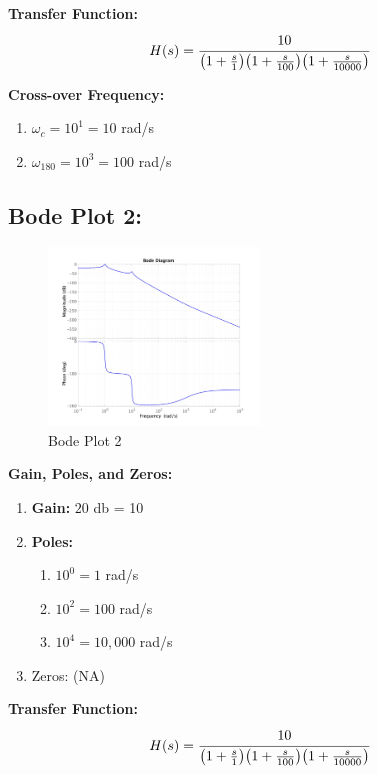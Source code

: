 \documentclass[letter]{article}
\numberwithin{equation}{section}
\begin{document}
\textbf{Transfer Function:}\[
	H(s) = \cfrac{10}{
		\qty(1 + \frac{s}{1}) \qty(1 + \frac{s}{100}) \qty(1 + \frac{s}{10000})
		}
\]

\textbf{Cross-over Frequency:}
\begin{enumerate}
	\item $\omega_c = 10^{1} = 10$ rad/s
	\item $\omega_{180} = 10^{3} = 100$ rad/s
\end{enumerate}



\newpage
\subsection{Bode Plot 2:}
\begin{figure}[h]
	\centering
	\includegraphics[width=0.5\textwidth]{figs/pblm3b.jpg}
	\caption{Bode Plot 2}
\end{figure}

\textbf{Gain, Poles, and Zeros:}
\begin{enumerate}
	\item \textbf{Gain:}  $20$ db = 10
	\item \textbf{Poles:}
	\begin{enumerate}
		\item $10^{0} = 1$ rad/s
		\item $10^{2} = 100$ rad/s
		\item $10^{4} = 10,000$ rad/s
	\end{enumerate}
	\item Zeros: (NA)
\end{enumerate}

\textbf{Transfer Function:}\[
	H(s) = \cfrac{10}{
		\qty(1 + \frac{s}{1}) \qty(1 + \frac{s}{100}) \qty(1 + \frac{s}{10000})
		}
\]


\end{document}
